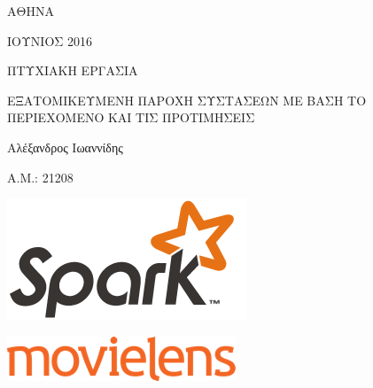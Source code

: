 \documentclass{report}
\begin{document}
\vspace{25mm}

\begin{center}
ΑΘΗΝΑ
\end{center}

\vspace{5mm}

\begin{center}
ΙΟΥΝΙΟΣ 2016
\end{center}
\newpage

\begin{center}
ΠΤΥΧΙΑΚΗ ΕΡΓΑΣΙΑ         
\end{center}

\vspace{5mm}

\begin{center}
ΕΞΑΤΟΜΙΚΕΥΜΕΝΗ ΠΑΡΟΧΗ ΣΥΣΤΑΣΕΩΝ ΜΕ ΒΑΣΗ ΤΟ ΠΕΡΙΕΧΟΜΕΝΟ ΚΑΙ ΤΙΣ ΠΡΟΤΙΜΗΣΕΙΣ
\end{center}

\vspace{10mm}

\begin{center}
Αλέξανδρος Ιωαννίδης
\end{center}

\begin{center}
Α.Μ.: 21208
\end{center}

\vspace{10mm}

\begin{center}
\includegraphics{sparklogotrademark}
\end{center}

\vspace{5mm}

\begin{center}
\includegraphics{mllogo}
\end{center}
\end{document}
